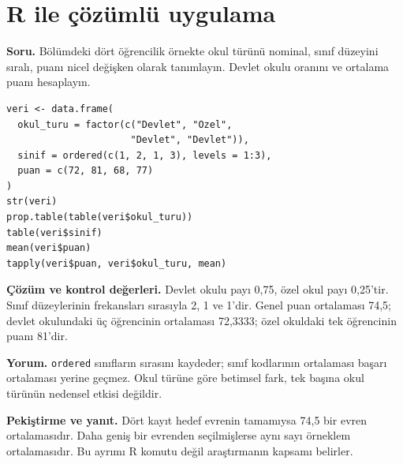 \section{R ile çözümlü uygulama}
\label{sec:r-b02}

\textbf{Soru.} Bölümdeki dört öğrencilik örnekte okul türünü nominal,
sınıf düzeyini sıralı, puanı nicel değişken olarak tanımlayın. Devlet okulu
oranını ve ortalama puanı hesaplayın.

\begin{lstlisting}[style=prismR]
veri <- data.frame(
  okul_turu = factor(c("Devlet", "Ozel",
                      "Devlet", "Devlet")),
  sinif = ordered(c(1, 2, 1, 3), levels = 1:3),
  puan = c(72, 81, 68, 77)
)
str(veri)
prop.table(table(veri$okul_turu))
table(veri$sinif)
mean(veri$puan)
tapply(veri$puan, veri$okul_turu, mean)
\end{lstlisting}

\begin{outputguidebox}
\textbf{Çözüm ve kontrol değerleri.} Devlet okulu payı 0,75, özel okul
payı 0,25'tir. Sınıf düzeylerinin frekansları sırasıyla 2, 1 ve 1'dir.
Genel puan ortalaması 74,5; devlet okulundaki üç öğrencinin ortalaması
72,3333; özel okuldaki tek öğrencinin puanı 81'dir.
\end{outputguidebox}

\textbf{Yorum.} \texttt{ordered} sınıfların sırasını kaydeder; sınıf
kodlarının ortalaması başarı ortalaması yerine geçmez. Okul türüne göre
betimsel fark, tek başına okul türünün nedensel etkisi değildir.

\textbf{Pekiştirme ve yanıt.} Dört kayıt hedef evrenin tamamıysa 74,5
bir evren ortalamasıdır. Daha geniş bir evrenden seçilmişlerse aynı sayı
örneklem ortalamasıdır. Bu ayrımı R komutu değil araştırmanın kapsamı belirler.